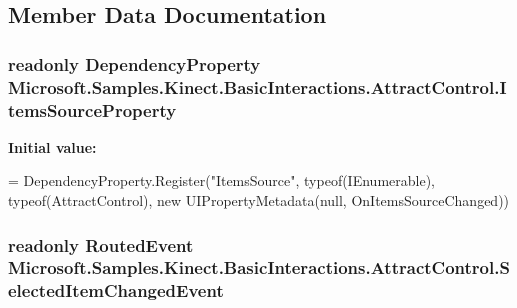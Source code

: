 \subsection{Member Data Documentation}
\hypertarget{class_microsoft_1_1_samples_1_1_kinect_1_1_basic_interactions_1_1_attract_control_a34fa426e0a01fafa025bcd3e78a9594f}{
\subsubsection[{Items\-Source\-Property}]{\setlength{\rightskip}{0pt plus 5cm}readonly Dependency\-Property Microsoft.\-Samples.\-Kinect.\-Basic\-Interactions.\-Attract\-Control.\-Items\-Source\-Property\hspace{0.3cm}{\ttfamily [static]}}}\label{class_microsoft_1_1_samples_1_1_kinect_1_1_basic_interactions_1_1_attract_control_a34fa426e0a01fafa025bcd3e78a9594f}
{\bfseries Initial value\-:}
\begin{DoxyCode}
=
            DependencyProperty.Register(\textcolor{stringliteral}{"ItemsSource"}, typeof(IEnumerable), typeof(AttractControl), \textcolor{keyword}{new} 
      UIPropertyMetadata(null, OnItemsSourceChanged))
\end{DoxyCode}
\hypertarget{class_microsoft_1_1_samples_1_1_kinect_1_1_basic_interactions_1_1_attract_control_a506478f7a318f99f15fe7fb2387fd6b3}{
\subsubsection[{Selected\-Item\-Changed\-Event}]{\setlength{\rightskip}{0pt plus 5cm}readonly Routed\-Event Microsoft.\-Samples.\-Kinect.\-Basic\-Interactions.\-Attract\-Control.\-Selected\-Item\-Changed\-Event\hspace{0.3cm}{\ttfamily [static]}}}\label{class_microsoft_1_1_samples_1_1_kinect_1_1_basic_interactions_1_1_attract_control_a506478f7a318f99f15fe7fb2387fd6b3}
